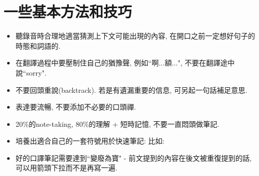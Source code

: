 \section{一些基本方法和技巧}
\begin{itemize}
  \itemsep0em
  \item 聽錄音時合理地適當猜測上下文可能出現的內容, 在開口之前一定想好句子的時態和詞語的.
  \item 在翻譯過程中要壓制住自己的猶豫聲, 例如``啊...額...", 不要在翻譯途中說``sorry".
  \item 不要回頭重說(backtrack). 若是有遺漏重要的信息, 可另起一句話補足意思.
  \item 表達要流暢, 不要添加不必要的口頭禪.
  \item 20\%的note-taking, 80\%的理解 + 短時記憶, 不要一直悶頭做筆記.
  \item 培養出適合自己的一套符號用於快速筆記: 比如:
    \item 好的口譯筆記需要達到``變廢為寶" - 前文提到的內容在後文被重復提到的話, 可以用箭頭下拉而不是再寫一遍.
\end{itemize}